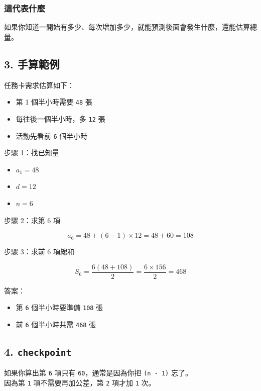 \documentclass[
  chinese,
  12pt,
  a4paper,
  oneside]{article}
\providecommand{\tightlist}{%
  \setlength{\itemsep}{0pt}\setlength{\parskip}{0pt}}
\begin{document}
\subsubsection{這代表什麼}\label{ux9019ux4ee3ux8868ux4ec0ux9ebc}

如果你知道一開始有多少、每次增加多少，就能預測後面會發生什麼，還能估算總量。

\subsection{3. 手算範例}\label{ux624bux7b97ux7bc4ux4f8b}

任務卡需求估算如下：

\begin{itemize}
\tightlist
\item
  第 1 個半小時需要 \texttt{48} 張
\item
  每往後一個半小時，多 \texttt{12} 張
\item
  活動先看前 \texttt{6} 個半小時
\end{itemize}

步驟 1：找已知量

\begin{itemize}
\tightlist
\item
  \(a_1 = 48\)
\item
  \(d = 12\)
\item
  \(n = 6\)
\end{itemize}

步驟 2：求第 6 項

\[
a_6 = 48 + (6 - 1)\times 12 = 48 + 60 = 108
\]

步驟 3：求前 6 項總和

\[
S_6 = \frac{6(48 + 108)}{2} = \frac{6\times 156}{2} = 468
\]

答案：

\begin{itemize}
\tightlist
\item
  第 \texttt{6} 個半小時要準備 \texttt{108} 張
\item
  前 \texttt{6} 個半小時共需 \texttt{468} 張
\end{itemize}

\subsection{\texorpdfstring{4.
\texttt{checkpoint}}{4. checkpoint}}\label{checkpoint}

如果你算出第 \texttt{6} 項只有 \texttt{60}，通常是因為你把
\texttt{(n\ -\ 1)} 忘了。\\
因為第 \texttt{1} 項不需要再加公差，第 \texttt{2} 項才加 \texttt{1} 次。
\end{document}
